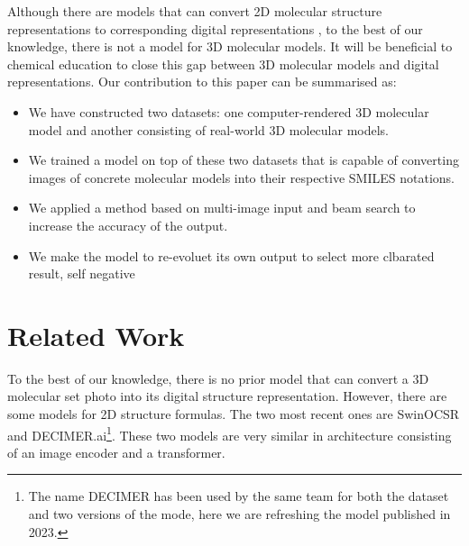 \documentclass{article}
\begin{document}
Although there are models that can convert 2D molecular structure representations to corresponding digital representations \autocite{swinocsr}\autocite{decimer}\autocite{chempix}, to the best of our knowledge, there is not a model for 3D molecular models. It will be beneficial to chemical education to close this gap between 3D molecular models and digital representations. 
Our contribution to this paper can be summarised as:
\begin{itemize}
\item We have constructed two datasets: one computer-rendered 3D molecular model and another consisting of real-world 3D molecular models.
\item We trained a model on top of these two datasets that is capable of converting images of concrete molecular models into their respective SMILES notations. 
\item We applied a method based on multi-image input and beam search to increase the accuracy of the output.
\item We make the model to re-evoluet its own output to select more clbarated result, self negative
\end{itemize}

\section{Related Work}
To the best of our knowledge, there is no prior model that can convert a 3D molecular set photo into its digital structure representation. However, there are some models for 2D structure formulas. The two most recent ones are SwinOCSR\autocite{swinocsr} and DECIMER.ai\footnote{The name DECIMER has been used by the same team for both the dataset and two versions of the mode, here we are refreshing the model published in 2023.}\autocite{decimer}. These two models are very similar in architecture consisting of an image encoder and a transformer.

\end{document}
